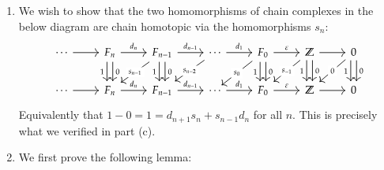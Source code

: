 \documentclass[12pt]{article}
\theoremstyle{definition}
\theoremstyle{definitionstyle}
\def\mbb#1{\mathbb{#1}}
\def\ve{\varepsilon}
\newcommand{\Z}{\mbb Z}
\begin{document}
\begin{enumerate}[label=(\alph*)]
        \item We wish to show that the two homomorphisms of chain complexes in the below diagram are chain homotopic via the homomorphisms $s_n$:
        \[\begin{tikzcd}
            \cdots & {F_n} & {F_{n-1}} & \cdots & {F_0} & \Z & 0 \\
            \cdots & {F_n} & {F_{n-1}} & \cdots & {F_0} & \Z & 0
            \arrow[from=1-1, to=1-2]
            \arrow["{d_n}", from=1-2, to=1-3]
            \arrow["1"', shift right, from=1-2, to=2-2]
            \arrow["0", shift left, from=1-2, to=2-2]
            \arrow["{d_{n-1}}", from=1-3, to=1-4]
            \arrow["{s_{n-1}}"{description}, from=1-3, to=2-2]
            \arrow["1"', shift right, from=1-3, to=2-3]
            \arrow["0", shift left, from=1-3, to=2-3]
            \arrow["{d_1}", from=1-4, to=1-5]
            \arrow["{s_{n-2}}"{description}, from=1-4, to=2-3]
            \arrow["\ve", from=1-5, to=1-6]
            \arrow["{s_0}"{description}, from=1-5, to=2-4]
            \arrow["1"', shift right, from=1-5, to=2-5]
            \arrow["0", shift left, from=1-5, to=2-5]
            \arrow[from=1-6, to=1-7]
            \arrow["{s_{-1}}"{description}, from=1-6, to=2-5]
            \arrow["1"', shift right, from=1-6, to=2-6]
            \arrow["0", shift left, from=1-6, to=2-6]
            \arrow["0"{description}, from=1-7, to=2-6]
            \arrow["0", shift left, from=1-7, to=2-7]
            \arrow["1"', shift right, from=1-7, to=2-7]
            \arrow[from=2-1, to=2-2]
            \arrow["{d_n}", from=2-2, to=2-3]
            \arrow["{d_{n-1}}", from=2-3, to=2-4]
            \arrow["{d_1}", from=2-4, to=2-5]
            \arrow["\ve", from=2-5, to=2-6]
            \arrow[from=2-6, to=2-7]
        \end{tikzcd}\]
        Equivalently that $1 - 0 = 1 = d_{n+1}s_n + s_{n-1}d_n$ for all $n$. This is precisely what we verified in part (c).

        \item We first prove the following lemma:
        

\end{enumerate}
\end{document}
